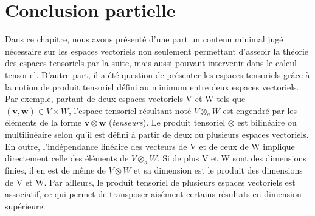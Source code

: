 \documentclass[11pt,a4paper,oneside]{book}
\newtheorem{defi}{Définition}[chapter]
\def\A{\mathcal A}
\def\K{\mathbb K}
\def\at{\otimes_{a}}
\def\v{\mathbf v}
\def\w{\mathbf w}
\begin{document}
%
\section*{Conclusion partielle}

Dans ce chapitre, nous avons présenté d'une part un contenu minimal jugé nécessaire sur les espaces vectoriels non seulement permettant d'asseoir la théorie des espaces tensoriels par la suite, mais aussi pouvant intervenir dans le calcul tensoriel.
D'autre part, il a été question de présenter les espaces tensoriels grâce à la notion de produit tensoriel défini au minimum entre deux espaces vectoriels. Par exemple, partant de deux espaces vectoriels V et W tels que $ (\v,\w)\in V\times W $, l'espace tensoriel  résultant noté $ V\at W $ est engendré par les éléments de la forme $ \v\otimes \w $ (\textit{tenseurs}). Le produit tensoriel $ \otimes  $ est bilinéaire ou multilinéaire selon qu'il est défini à partir de deux ou plusieurs espaces vectoriels. En outre, l'indépendance linéaire des vecteurs de V et de ceux de W implique directement celle des éléments de $ V\at W $. Si de plus  V et W sont des dimensions finies, il en est de même de $ V\otimes W $  et sa dimension est le produit des dimensions de V et W. Par ailleurs, le produit tensoriel de plusieurs espaces vectoriels est associatif, ce qui permet de transposer aisément certains résultats en dimension supérieure.
\end{document}
